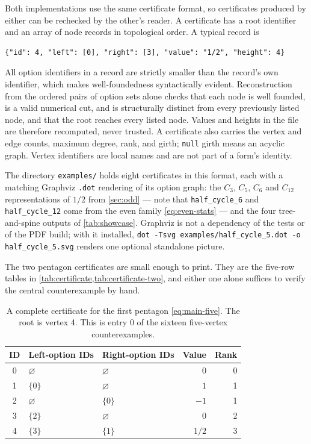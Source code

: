 \documentclass[11pt,a4paper]{article}
\numberwithin{equation}{section}
\theoremstyle{definition}
\theoremstyle{remark}
\newcommand{\code}[1]{\texttt{#1}}
\begin{document}
Both implementations use the same certificate format, so certificates produced by
either can be rechecked by the other's reader. A certificate has a root
identifier and an array of node records in topological order. A typical record is
\begin{lstlisting}
{"id": 4, "left": [0], "right": [3], "value": "1/2", "height": 4}
\end{lstlisting}
All option identifiers in a record are strictly smaller than the record's own
identifier, which makes well-foundedness syntactically evident. Reconstruction
from the ordered pairs of option sets alone checks that each node is well
founded, is a valid numerical cut, and is structurally distinct from every
previously listed node, and that the root reaches every listed node. Values and
heights in the file are therefore recomputed, never trusted. A certificate also
carries the vertex and edge counts, maximum degree, rank, and girth; \code{null}
girth means an acyclic graph. Vertex identifiers are local names and are not part
of a form's identity.

The directory \code{examples/} holds eight certificates in this format, each with
a matching Graphviz \code{.dot} rendering of its option graph: the $C_3$, $C_5$,
$C_6$ and $C_{12}$ representations of $1/2$ from \cref{sec:odd} --- note that
\code{half\_cycle\_6} and \code{half\_cycle\_12} come from the even family
\eqref{eq:even-stats} --- and the four tree-and-spine outputs of
\cref{tab:showcase}. Graphviz is not a dependency of the tests or of the PDF
build; with it installed,
\code{dot -Tsvg examples/half\_cycle\_5.dot -o half\_cycle\_5.svg} renders one
optional standalone picture.

The two pentagon certificates are small enough to print. They are the five-row
tables in \cref{tab:certificate,tab:certificate-two}, and either one alone
suffices to verify the central counterexample by hand.

\begin{table}[htbp]
\centering
\begin{tabular}{@{}cllrr@{}}
\toprule
ID & Left-option IDs & Right-option IDs & Value & Rank\\
\midrule
0 & $\varnothing$ & $\varnothing$ & $0$ &0\\
1 & $\{0\}$ & $\varnothing$ & $1$ &1\\
2 & $\varnothing$ & $\{0\}$ & $-1$ &1\\
3 & $\{2\}$ & $\varnothing$ & $0$ &2\\
4 & $\{3\}$ & $\{1\}$ & $1/2$ &3\\
\bottomrule
\end{tabular}
\caption{A complete certificate for the first pentagon \eqref{eq:main-five}. The
root is vertex 4. This is entry $0$ of the sixteen five-vertex counterexamples.}
\label{tab:certificate}
\end{table}
\end{document}
